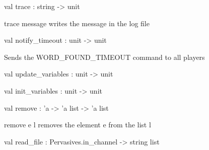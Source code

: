 \documentclass[11pt]{article}
\begin{document}
\label{val:Server.trace}\begin{ocamldoccode}
val trace : string -> unit
\end{ocamldoccode}
\begin{ocamldocdescription}
trace message writes the message in the log file


\end{ocamldocdescription}




\label{val:Server.notify-underscoretimeout}\begin{ocamldoccode}
val notify_timeout : unit -> unit
\end{ocamldoccode}
\begin{ocamldocdescription}
Sends the WORD\_FOUND\_TIMEOUT command to all players


\end{ocamldocdescription}




\label{val:Server.update-underscorevariables}\begin{ocamldoccode}
val update_variables : unit -> unit
\end{ocamldoccode}




\label{val:Server.init-underscorevariables}\begin{ocamldoccode}
val init_variables : unit -> unit
\end{ocamldoccode}




\label{val:Server.remove}\begin{ocamldoccode}
val remove : 'a -> 'a list -> 'a list
\end{ocamldoccode}
\begin{ocamldocdescription}
remove e l removes the element e from the list l


\end{ocamldocdescription}




\label{val:Server.read-underscorefile}\begin{ocamldoccode}
val read_file : Pervasives.in_channel -> string list
\end{ocamldoccode}
\end{document}
